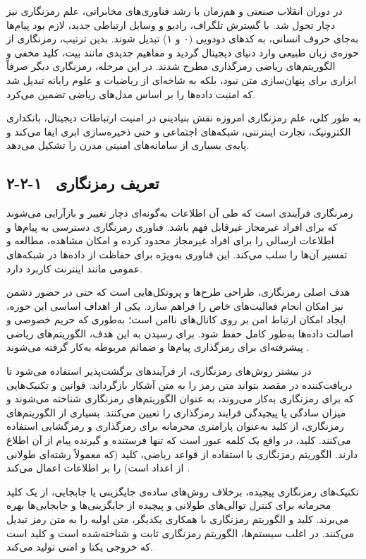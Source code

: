 در دوران انقلاب صنعتی و هم‌زمان با رشد فناوری‌های مخابراتی، علم رمزنگاری نیز دچار تحول شد. با گسترش تلگراف، رادیو و وسایل ارتباطی جدید، لازم بود پیام‌ها به‌جای حروف انسانی، به کدهای دودویی (۰ و ۱) تبدیل شوند. بدین ترتیب، رمزنگاری از حوزه‌ی زبان طبیعی وارد دنیای دیجیتال گردید و مفاهیم جدیدی مانند بیت، کلید مخفی و الگوریتم‌های ریاضی رمزگذاری مطرح شدند. در این مرحله، رمزنگاری دیگر صرفاً ابزاری برای پنهان‌سازی متن نبود، بلکه به شاخه‌ای از ریاضیات و علوم رایانه تبدیل شد که امنیت داده‌ها را بر اساس مدل‌های ریاضی تضمین می‌کرد\cite{ref16}.

به طور کلی، علم رمزنگاری امروزه نقش بنیادینی در امنیت ارتباطات دیجیتال، بانکداری الکترونیک، تجارت اینترنتی، شبکه‌های اجتماعی و حتی ذخیره‌سازی ابری ایفا می‌کند و پایه‌ی بسیاری از سامانه‌های امنیتی مدرن را تشکیل می‌دهد.

\subsection{۲-۲-۱  تعریف رمزنگاری}

رمزنگاری فرآیندی است که طی آن اطلاعات به‌گونه‌ای دچار تغییر و بازآرایی می‌شوند که برای افراد غیرمجاز غیرقابل فهم باشد. فناوری رمزنگاری دسترسی به پیام‌ها و اطلاعات ارسالی را برای افراد غیرمجاز محدود کرده و امکان مشاهده، مطالعه و تفسیر آن‌ها را سلب می‌کند. این فناوری به‌ویژه برای حفاظت از داده‌ها در شبکه‌های عمومی مانند اینترنت کاربرد دارد\cite{ref17}.

هدف اصلی رمزنگاری، طراحی طرح‌ها و پروتکل‌هایی است که حتی در حضور دشمن نیز امکان انجام فعالیت‌های خاص را فراهم سازد. یکی از اهداف اساسی این حوزه، ایجاد امکان ارتباط امن بر روی کانال‌های ناامن است؛ به‌طوری که حریم خصوصی و اصالت داده‌ها به‌طور کامل حفظ شود. برای رسیدن به این هدف، الگوریتم‌های ریاضی پیشرفته‌ای برای رمزگذاری پیام‌ها و ضمائم مربوطه به‌کار گرفته می‌شوند \cite{ref18}.

در بیشتر روش‌های رمزنگاری، از فرآیندهای برگشت‌پذیر استفاده می‌شود تا دریافت‌کننده در مقصد بتواند متن رمز را به متن آشکار  بازگرداند. قوانین و تکنیک‌هایی که برای رمزنگاری به‌کار می‌روند، به عنوان الگوریتم‌های رمزنگاری شناخته می‌شوند و میزان سادگی یا پیچیدگی فرایند رمزگذاری را تعیین می‌کنند. بسیاری از الگوریتم‌های رمزنگاری، از کلید  به‌عنوان پارامتری محرمانه برای رمزگذاری و رمزگشایی استفاده می‌کنند. کلید، در واقع یک کلمه عبور است که تنها فرستنده و گیرنده پیام از آن اطلاع دارند. الگوریتم رمزنگاری با استفاده از قواعد ریاضی، کلید (که معمولاً رشته‌ای طولانی از اعداد است) را بر اطلاعات اعمال می‌کند \cite{ref19}.

تکنیک‌های رمزنگاری پیچیده، برخلاف روش‌های ساده‌ی جایگزینی یا جابجایی، از یک کلید محرمانه برای کنترل توالی‌های طولانی و پیچیده از جایگزینی‌ها و جابجایی‌ها بهره می‌برند. کلید و الگوریتم رمزنگاری با همکاری یکدیگر، متن اولیه را به متن رمز تبدیل می‌کنند. در اغلب سیستم‌ها، الگوریتم رمزنگاری ثابت و شناخته‌شده است و کلید است که خروجی یکتا و امنی تولید می‌کند\cite{ref20}.

